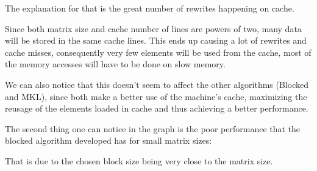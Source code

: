 \documentclass[unicode,11pt,a4paper,oneside,numbers=endperiod,openany]{scrartcl}
\begin{document}
\begin{enumerate}
            The explanation for that is the great number of rewrites happening on cache. 

            Since both matrix size and cache number of lines are powers of two, many data will be stored in the same cache lines. 
            This ends up causing a lot of rewrites and cache misses, consequently very few elements will be used from the cache, most of the memory accesses will have to be done on slow memory.

            We can also notice that this doesn't seem to affect the other algorithms (Blocked and MKL), since both make a better use of the machine's cache, maximizing the reusage of the elements loaded in cache and thus achieving a better performance.

            The second thing one can notice in the graph is the poor performance that the blocked algorithm developed has for small matrix sizes:

            That is due to the chosen block size being very close to the matrix size.


\end{enumerate}
\end{document}
